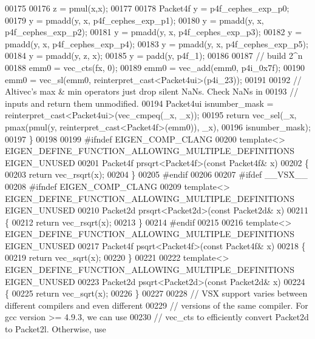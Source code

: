 \begin{DoxyCode}
00175 
00176   z = pmul(x,x);
00177 
00178   Packet4f y = p4f\_cephes\_exp\_p0;
00179   y = pmadd(y, x, p4f\_cephes\_exp\_p1);
00180   y = pmadd(y, x, p4f\_cephes\_exp\_p2);
00181   y = pmadd(y, x, p4f\_cephes\_exp\_p3);
00182   y = pmadd(y, x, p4f\_cephes\_exp\_p4);
00183   y = pmadd(y, x, p4f\_cephes\_exp\_p5);
00184   y = pmadd(y, z, x);
00185   y = padd(y, p4f\_1);
00186 
00187   \textcolor{comment}{// build 2^n}
00188   emm0 = vec\_cts(fx, 0);
00189   emm0 = vec\_add(emm0, p4i\_0x7f);
00190   emm0 = vec\_sl(emm0, reinterpret\_cast<Packet4ui>(p4i\_23));
00191 
00192   \textcolor{comment}{// Altivec's max & min operators just drop silent NaNs. Check NaNs in }
00193   \textcolor{comment}{// inputs and return them unmodified.}
00194   Packet4ui isnumber\_mask = \textcolor{keyword}{reinterpret\_cast<}Packet4ui\textcolor{keyword}{>}(vec\_cmpeq(\_x, \_x));
00195   \textcolor{keywordflow}{return} vec\_sel(\_x, pmax(pmul(y, reinterpret\_cast<Packet4f>(emm0)), \_x),
00196                  isnumber\_mask);
00197 \}
00198 
00199 \textcolor{preprocessor}{#ifndef EIGEN\_COMP\_CLANG}
00200 \textcolor{keyword}{template}<> EIGEN\_DEFINE\_FUNCTION\_ALLOWING\_MULTIPLE\_DEFINITIONS EIGEN\_UNUSED
00201 Packet4f prsqrt<Packet4f>(\textcolor{keyword}{const} Packet4f& x)
00202 \{
00203   \textcolor{keywordflow}{return}  vec\_rsqrt(x);
00204 \}
00205 \textcolor{preprocessor}{#endif}
00206 
00207 \textcolor{preprocessor}{#ifdef \_\_VSX\_\_}
00208 \textcolor{preprocessor}{#ifndef EIGEN\_COMP\_CLANG}
00209 \textcolor{keyword}{template}<> EIGEN\_DEFINE\_FUNCTION\_ALLOWING\_MULTIPLE\_DEFINITIONS EIGEN\_UNUSED
00210 Packet2d prsqrt<Packet2d>(\textcolor{keyword}{const} Packet2d& x)
00211 \{
00212   \textcolor{keywordflow}{return}  vec\_rsqrt(x);
00213 \}
00214 \textcolor{preprocessor}{#endif}
00215 
00216 \textcolor{keyword}{template}<> EIGEN\_DEFINE\_FUNCTION\_ALLOWING\_MULTIPLE\_DEFINITIONS EIGEN\_UNUSED
00217 Packet4f psqrt<Packet4f>(\textcolor{keyword}{const} Packet4f& x)
00218 \{
00219   \textcolor{keywordflow}{return}  vec\_sqrt(x);
00220 \}
00221 
00222 \textcolor{keyword}{template}<> EIGEN\_DEFINE\_FUNCTION\_ALLOWING\_MULTIPLE\_DEFINITIONS EIGEN\_UNUSED
00223 Packet2d psqrt<Packet2d>(\textcolor{keyword}{const} Packet2d& x)
00224 \{
00225   \textcolor{keywordflow}{return}  vec\_sqrt(x);
00226 \}
00227 
00228 \textcolor{comment}{// VSX support varies between different compilers and even different}
00229 \textcolor{comment}{// versions of the same compiler.  For gcc version >= 4.9.3, we can use}
00230 \textcolor{comment}{// vec\_cts to efficiently convert Packet2d to Packet2l.  Otherwise, use}

\end{DoxyCode}
